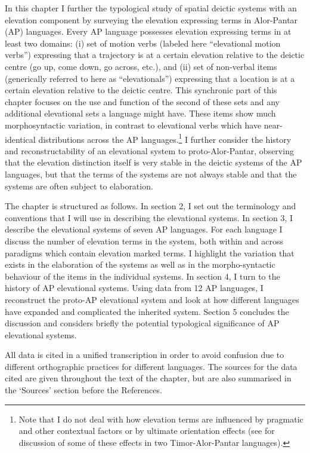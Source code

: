 In this chapter I further the typological study of spatial deictic systems with an elevation component by surveying the elevation expressing terms in Alor-Pantar (AP) languages. Every AP language possesses elevation expressing terms in at least two domains: (i) set of motion verbs (labeled here ``elevational motion verbs'') expressing that a trajectory is at a certain elevation relative to the deictic centre (go up, come down, go across, etc.), and (ii) set of non-verbal items (generically referred to here as ``elevationals'') expressing that a location is at a certain elevation relative to the deictic centre. This synchronic part of this chapter focuses on the use and function of the second of these sets and any additional elevational sets a language might have. These items show much morphosyntactic variation, in contrast to elevational verbs which have near-identical distributions across the AP languages.\footnote{Note that I do not deal with how elevation terms are influenced by pragmatic and other contextual factors or by ultimate orientation effects (see \citet{Schapper2012} for discussion of some of these effects in two Timor-Alor-Pantar languages).} I further consider the history and reconstructability of an elevational system to proto-Alor-Pantar, observing that the elevation distinction itself is very stable in the deictic systems of the AP languages, but that the terms of the systems are not always stable and that the systems are often subject to elaboration.

The chapter is structured as follows. In section 2, I set out the terminology and conventions that I will use in describing the elevational systems. In section 3, I describe the elevational systems of seven AP languages. For each language I discuss the number of elevation terms in the system, both within and across paradigms which contain elevation marked terms. I highlight the variation that exists in the elaboration of the systems as well as in the morpho-syntactic behaviour of the items in the individual systems. In section 4, I turn to the history of AP elevational systems. Using data from 12 AP languages, I reconstruct the proto-AP elevational system and look at how different languages have expanded and complicated the inherited system. Section 5 concludes the discussion and considers briefly the potential typological significance of AP elevational systems.

All data is cited in a unified transcription in order to avoid confusion due to different orthographic practices for different languages. The sources for the data cited are given throughout the text of the chapter, but are also summarised in the `Sources' section before the References.

